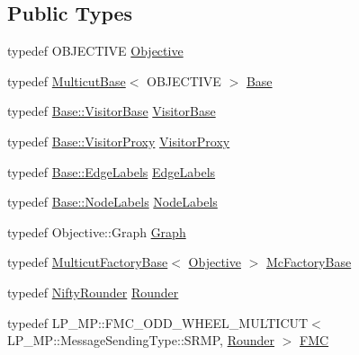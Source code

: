 \subsection*{Public Types}
\begin{DoxyCompactItemize}
\item 
typedef O\+B\+J\+E\+C\+T\+I\+V\+E \hyperlink{classnifty_1_1graph_1_1MulticutMp_a5dbc4d81a00cd2ad98b4d28bc64f8ea8}{Objective}
\item 
typedef \hyperlink{classnifty_1_1graph_1_1MulticutBase}{Multicut\+Base}$<$ O\+B\+J\+E\+C\+T\+I\+V\+E $>$ \hyperlink{classnifty_1_1graph_1_1MulticutMp_a736d0e61f4bd62aa9341791d2c888f28}{Base}
\item 
typedef \hyperlink{classnifty_1_1graph_1_1MulticutBase_a5882fb69df59d8113f6a81a0dac26eaa}{Base\+::\+Visitor\+Base} \hyperlink{classnifty_1_1graph_1_1MulticutMp_a4a80c1f30dc62d72203f2ed6e7bdf1eb}{Visitor\+Base}
\item 
typedef \hyperlink{classnifty_1_1graph_1_1MulticutBase_a6ede271a3cb0ae4711a7e9da2b07efa9}{Base\+::\+Visitor\+Proxy} \hyperlink{classnifty_1_1graph_1_1MulticutMp_af4895ae0b773b8f102cb9644551cd38d}{Visitor\+Proxy}
\item 
typedef \hyperlink{classnifty_1_1graph_1_1MulticutBase_aaeefe3c5df81d9c9efffec878cf2fcd7}{Base\+::\+Edge\+Labels} \hyperlink{classnifty_1_1graph_1_1MulticutMp_aa141a402e0a46d60204f16ce0fef24ff}{Edge\+Labels}
\item 
typedef \hyperlink{classnifty_1_1graph_1_1MulticutBase_afba61ad2919d0fad20b3745af19309da}{Base\+::\+Node\+Labels} \hyperlink{classnifty_1_1graph_1_1MulticutMp_ac6eb2553f7db7fd34c2c3a7c182c695d}{Node\+Labels}
\item 
typedef Objective\+::\+Graph \hyperlink{classnifty_1_1graph_1_1MulticutMp_a8e58eea9eaf877b4968c9a0a0eafea78}{Graph}
\item 
typedef \hyperlink{classnifty_1_1graph_1_1MulticutFactoryBase}{Multicut\+Factory\+Base}$<$ \hyperlink{classnifty_1_1graph_1_1MulticutMp_a5dbc4d81a00cd2ad98b4d28bc64f8ea8}{Objective} $>$ \hyperlink{classnifty_1_1graph_1_1MulticutMp_a6da7773d133f8c60d195bf6bc42dddcd}{Mc\+Factory\+Base}
\item 
typedef \hyperlink{structnifty_1_1graph_1_1MulticutMp_1_1NiftyRounder}{Nifty\+Rounder} \hyperlink{classnifty_1_1graph_1_1MulticutMp_a475f0ecbf40dffd9cdad45867068edf4}{Rounder}
\item 
typedef L\+P\+\_\+\+M\+P\+::\+F\+M\+C\+\_\+\+O\+D\+D\+\_\+\+W\+H\+E\+E\+L\+\_\+\+M\+U\+L\+T\+I\+C\+U\+T$<$ L\+P\+\_\+\+M\+P\+::\+Message\+Sending\+Type\+::\+S\+R\+M\+P, \hyperlink{classnifty_1_1graph_1_1MulticutMp_a475f0ecbf40dffd9cdad45867068edf4}{Rounder} $>$ \hyperlink{classnifty_1_1graph_1_1MulticutMp_a89b39a5447859b773cda4ec6ca0eb7ec}{F\+M\+C}

\end{DoxyCompactItemize}
